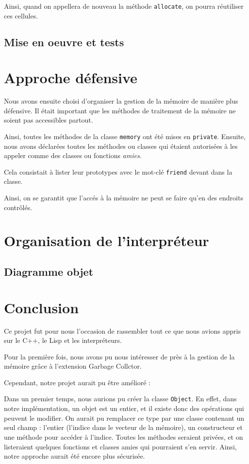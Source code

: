 \documentclass[12pt]{article}
\def\code #1{\lstinline{#1}}
\begin{document}
Ainsi, quand on appellera de nouveau la méthode \code{allocate}, on pourra réutiliser ces cellules.


\subsection{Mise en oeuvre et tests}

\section{Approche défensive}

Nous avons ensuite choisi d'organiser la gestion de la mémoire de manière plus défensive. Il était important que les méthodes de traitement de la mémoire ne soient pas accessibles partout.

Ainsi, toutes les méthodes de la classe \code{memory} ont été mises en \code{private}. Ensuite, nous avons déclarées toutes les méthodes ou classes qui étaient autorisées à les appeler comme des classes ou fonctions \emph{amies}.

Cela consistait à lister leur prototypes avec le mot-clé \code{friend} devant dans la classe.

Ainsi, on se garantit que l'accés à la mémoire ne peut se faire qu'en des endroits contrôlés.


\section{Organisation de l'interpréteur}

\subsection{Diagramme objet}

\section{Conclusion}

Ce projet fut pour nous l'occasion de rassembler tout ce que nous avions appris sur le C++, le Lisp et les interpréteurs.

Pour la première fois, nous avons pu nous intéresser de près à la gestion de la mémoire grâce à l'extension Garbage Collctor.


Cependant, notre projet aurait pu être amélioré :

Dans un premier temps, nous aurions pu créer la classe \code{Object}.
En effet, dans notre implémentation, un objet est un entier, et il existe donc des opérations qui peuvent le modifier. On aurait pu remplacer ce type par une classe contenant un seul champ : l'entier (l'indice dans le vecteur de la mémoire), un constructeur et une méthode pour accéder à l'indice. Toutes les méthodes seraient privées, et on listeraient quelques fonctions et classes amies qui pourraient s'en servir. Ainsi, notre approche aurait été encore plus sécurisée.
\end{document}
